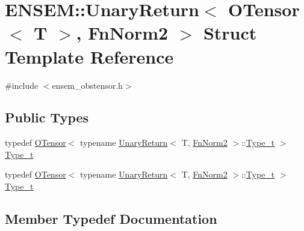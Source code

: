 \hypertarget{structENSEM_1_1UnaryReturn_3_01OTensor_3_01T_01_4_00_01FnNorm2_01_4}{}\section{E\+N\+S\+EM\+:\+:Unary\+Return$<$ O\+Tensor$<$ T $>$, Fn\+Norm2 $>$ Struct Template Reference}
\label{structENSEM_1_1UnaryReturn_3_01OTensor_3_01T_01_4_00_01FnNorm2_01_4}


{\ttfamily \#include $<$ensem\+\_\+obstensor.\+h$>$}

\subsection*{Public Types}
\begin{DoxyCompactItemize}
\item 
typedef \mbox{\hyperlink{classENSEM_1_1OTensor}{O\+Tensor}}$<$ typename \mbox{\hyperlink{structENSEM_1_1UnaryReturn}{Unary\+Return}}$<$ T, \mbox{\hyperlink{structENSEM_1_1FnNorm2}{Fn\+Norm2}} $>$\+::\mbox{\hyperlink{structENSEM_1_1UnaryReturn_3_01OTensor_3_01T_01_4_00_01FnNorm2_01_4_a61af55ec610c7d6312c97907937f00bd}{Type\+\_\+t}} $>$ \mbox{\hyperlink{structENSEM_1_1UnaryReturn_3_01OTensor_3_01T_01_4_00_01FnNorm2_01_4_a61af55ec610c7d6312c97907937f00bd}{Type\+\_\+t}}
\item 
typedef \mbox{\hyperlink{classENSEM_1_1OTensor}{O\+Tensor}}$<$ typename \mbox{\hyperlink{structENSEM_1_1UnaryReturn}{Unary\+Return}}$<$ T, \mbox{\hyperlink{structENSEM_1_1FnNorm2}{Fn\+Norm2}} $>$\+::\mbox{\hyperlink{structENSEM_1_1UnaryReturn_3_01OTensor_3_01T_01_4_00_01FnNorm2_01_4_a61af55ec610c7d6312c97907937f00bd}{Type\+\_\+t}} $>$ \mbox{\hyperlink{structENSEM_1_1UnaryReturn_3_01OTensor_3_01T_01_4_00_01FnNorm2_01_4_a61af55ec610c7d6312c97907937f00bd}{Type\+\_\+t}}
\end{DoxyCompactItemize}


\subsection{Member Typedef Documentation}
\mbox{\label{structENSEM_1_1UnaryReturn_3_01OTensor_3_01T_01_4_00_01FnNorm2_01_4_a61af55ec610c7d6312c97907937f00bd}} 

